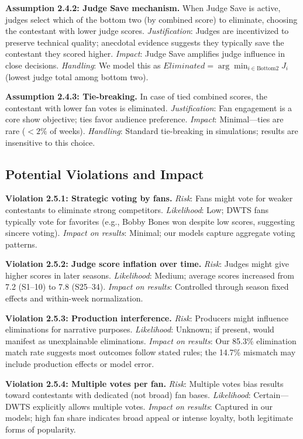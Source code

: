 \documentclass{mcmthesis}
\begin{document}
\textbf{Assumption 2.4.2: Judge Save mechanism.}
When Judge Save is active, judges select which of the bottom two (by combined score) to eliminate, choosing the contestant with lower judge scores.
\textit{Justification}: Judges are incentivized to preserve technical quality; anecdotal evidence suggests they typically save the contestant they scored higher.
\textit{Impact}: Judge Save amplifies judge influence in close decisions.
\textit{Handling}: We model this as $Eliminated = \arg\min_{i \in \text{Bottom2}} J_i$ (lowest judge total among bottom two).

\textbf{Assumption 2.4.3: Tie-breaking.}
In case of tied combined scores, the contestant with lower fan votes is eliminated.
\textit{Justification}: Fan engagement is a core show objective; ties favor audience preference.
\textit{Impact}: Minimal---ties are rare ($<2\%$ of weeks). \textit{Handling}: Standard tie-breaking in simulations; results are insensitive to this choice.


\subsection{Potential Violations and Impact}

\textbf{Violation 2.5.1: Strategic voting by fans.}
\textit{Risk}: Fans might vote for weaker contestants to eliminate strong competitors.
\textit{Likelihood}: Low; DWTS fans typically vote for favorites (e.g., Bobby Bones won despite low scores, suggesting sincere voting).
\textit{Impact on results}: Minimal; our models capture aggregate voting patterns.

\textbf{Violation 2.5.2: Judge score inflation over time.}
\textit{Risk}: Judges might give higher scores in later seasons.
\textit{Likelihood}: Medium; average scores increased from 7.2 (S1--10) to 7.8 (S25--34).
\textit{Impact on results}: Controlled through season fixed effects and within-week normalization.

\textbf{Violation 2.5.3: Production interference.}
\textit{Risk}: Producers might influence eliminations for narrative purposes.
\textit{Likelihood}: Unknown; if present, would manifest as unexplainable eliminations.
\textit{Impact on results}: Our 85.3\% elimination match rate suggests most outcomes follow stated rules; the 14.7\% mismatch may include production effects or model error.

\textbf{Violation 2.5.4: Multiple votes per fan.}
\textit{Risk}: Multiple votes bias results toward contestants with dedicated (not broad) fan bases.
\textit{Likelihood}: Certain---DWTS explicitly allows multiple votes.
\textit{Impact on results}: Captured in our models; high fan share indicates broad appeal or intense loyalty, both legitimate forms of popularity.
\end{document}
